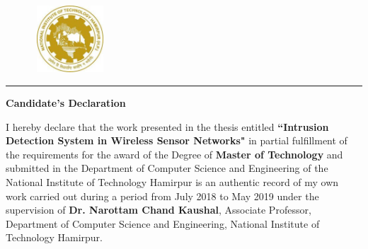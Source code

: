 \graphicspath{{Figures/PNG/}{Figures/}}
\vspace{-4.5\baselineskip}
\begin{figure}[htbp]
	\includegraphics[height=2.5cm,width=2.7cm]{h}
\end{figure}
\vspace{-5.0\baselineskip}
\begin{center} 
\end{center}
\noindent\rule{\linewidth}{2pt}
\begin{center}
{\bf\Large \hspace{1cm} Candidate's Declaration }\\
\par\vspace{5mm}
\end{center}
\noindent I hereby declare that the work presented in the thesis entitled \textbf{``Intrusion Detection System in Wireless Sensor Networks"} in partial fulfillment of the requirements for the award of the Degree of \textbf{Master of Technology} and submitted in the Department of Computer Science and Engineering of the National Institute of Technology Hamirpur is an authentic record of my own work carried out during a period from July 2018 to May 2019 under the supervision of  \textbf{Dr. Narottam Chand Kaushal}, Associate Professor, Department of Computer Science and Engineering, National Institute of Technology Hamirpur.
